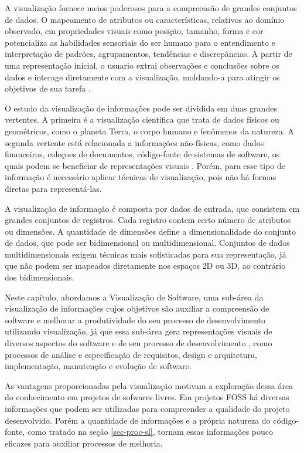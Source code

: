 A visualização fornece meios poderosos para a compreensão de grandes conjuntos de dados. O mapeamento de atributos ou características, relativos ao domínio observado, em propriedades visuais como posição, tamanho, forma e cor potencializa as habilidades sensoriais do ser humano para o entendimento e interpretação de padrões, agrupamentos, tendências e discrepâncias. A partir de uma representação inicial, o usuario extrai observações e conclusões sobre os dados e interage diretamente com a visualização, moldando-a para atingir os objetivos de sua tarefa \cite{rafaelmessiasmartins2012}.

O estudo da visualização de informações pode ser dividida em duas grandes vertentes. A primeira é a visualização científica que trata de dados físicos ou geométricos, como o planeta Terra, o corpo humano e fenômenos da natureza. A segunda vertente está relacionada a informações não-físicas, como dados financeiros, coleçoes de documentos, código-fonte de sistemas de software, os quais podem se beneficiar de representações visuais \cite{rafaelmessiasmartins2012}. Porém, para esse tipo de informação é necessário aplicar técnicas de visualização, pois não há formas diretas para representá-las. %

A visualização de informação é composta por dados de entrada, que consistem em grandes conjuntos de registros. Cada registro contem certo número de atributos ou dimensões. A quantidade de dimensões define a dimensionalidade do conjunto de dados, que pode ser bidimensional ou multidimensional. Conjuntos de dados multidimensionais exigem técnicas mais sofisticadas para sua representação, já que não podem ser mapeados diretamente nos espaços 2D ou 3D, ao contrário dos bidimensionais.

Neste capítulo, abordamos a Visualização de Software, uma sub-área da visualização de informações cujos objetivos são auxiliar a compreensão de software e melhorar a produtividade do seu processo de desenvolvimento utilizando visualização, já que essa sub-área gera representações visuais de diversos aspectos do software e de seu processo de desenvolvimento \cite{rafaelmessiasmartins2012}, como processos de análise e especificação de requisitos, design e arquitetura, implementação, manutenção e evolução de software.

As vantagens proporcionadas pela visualização motivam a exploração dessa área do conhecimento em projetos de sofwares livres. Em projetos FOSS há diversas informações que podem ser utilizadas para compreender a qualidade do projeto desenvolvido. Porém a quantidade de informações e a própria natureza do código-fonte, como tratado na seção \ref{sec-proc-sl}, tornam essas informações pouco eficazes para auxiliar processos de melhoria.

